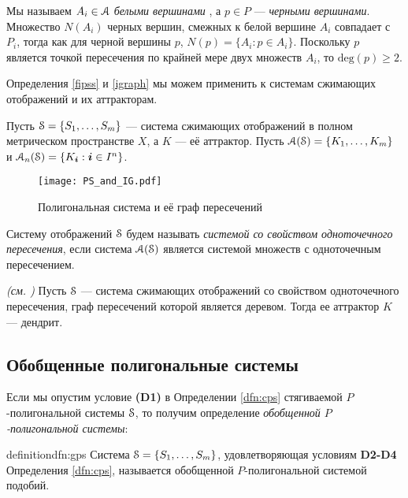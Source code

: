 Мы называем $A_i\in {\EuScript A}$ {\em белыми вершинами} , а $p\in P$ --- {\em черными вершинами}.  
Множество $N(A_i)$ черных вершин, смежных к белой вершине $A_i$ совпадает с $P_i$, тогда как для черной вершины $p$,  $N(p)=\{A_i:p\in A_i\}$. 
Поскольку $p$ является точкой пересечения по крайней мере двух множеств $A_i$, то $ \mathrm{deg}(p)\ge 2$.
 
Определения \ref{fipss} и \ref{igraph}  мы можем применить к системам сжимающих отображений и их аттракторам.

Пусть ${\EuScript S}=\{S_1,\ldots ,S_m\}$ --- система сжимающих отображений в полном метрическом пространстве $X$, а $K$ --- её аттрактор. 
Пусть ${\EuScript A}({\EuScript S})=\{K_1,\ldots , K_m\}$ и ${\EuScript A}_n({\EuScript S})=\{K_{\bm{i}}:{\bm{i}}\in I^n\}$.

\begin{figure}[H]
    \centering
    \texttt{[image: PS\_and\_IG.pdf]}
    \caption{Полигональная система и её граф пересечений}
    \label{img:exgp1}
\end{figure}
 
\begin{definition}\label{fipcs}
Систему отображений ${\EuScript S}$ будем называть {\em системой со свойством одноточечного пересечения}, если система ${\EuScript A}({\EuScript S})$ является системой множеств с одноточечным пересечением.
\end{definition}

\begin{theorem}{\em (см. \cite[Th.1.7]{FPS})} \label{fpden}
Пусть ${\EuScript S}$ --- система сжимающих отображений со свойством одноточечного пересечения, граф пересечений которой является деревом. 
Тогда ее аттрактор $K$ --- дендрит.
\end{theorem}



\subsection{Обобщенные полигональные системы}



Если мы опустим условие {\bf(D1)} в Определении \ref{dfn:cps} стягиваемой $P$-полигональной системы ${\EuScript S}$, то получим определение {\em обобщенной $P$-полигональной системы}:

\begin{restatethis}{definition}{dfn:gps} \label{dfn:gps}
Система ${\EuScript S}=\{S_1,\ldots ,S_m\} $, удовлетворяющая условиям {\bf D2-D4} Определения \ref{dfn:cps}, называется обобщенной $P$-полигональной системой подобий.    
\end{restatethis}




